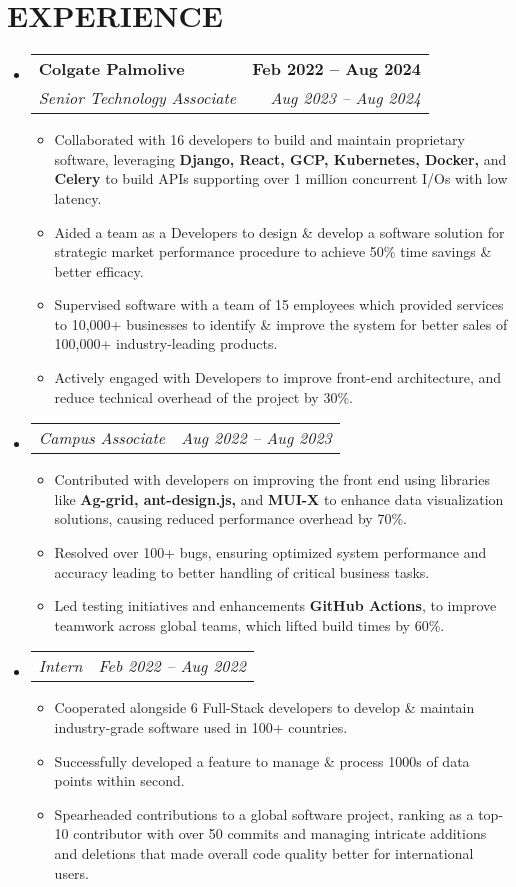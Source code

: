 \documentclass[letterpaper,10pt]{article}
\makeatletter
\newcommand{\resumeItem}[1]{
  \item\small{
    {#1 \vspace{-2pt}}
  }
}
\newcommand{\resumeSubheading}[4]{
  \vspace{2pt}\item
    \begin{tabular*}{1.0\textwidth}[t]{l@{\extracolsep{\fill}}r}
      \textbf{\large#1} & \textbf{\normalsize #2} \\
      \textit{\large#3} & \textit{\small #4} \\
    \end{tabular*}\vspace{-7pt}
}
\newcommand{\resumeSubSubheading}[2]{
  \vspace{-6pt}\item
    \begin{tabular*}{1.0\textwidth}[t]{l@{\extracolsep{\fill}}r}
      \textit{\large#1} & \textit{\small #2} \\
    \end{tabular*}\vspace{-7pt}
}
\newcommand{\resumeSubHeadingListStart}{\begin{itemize}[leftmargin=0.0in, label={}]}
\newcommand{\resumeSubHeadingListEnd}{\end{itemize}}
\newcommand{\resumeItemListStart}{\begin{itemize}}
\newcommand{\resumeItemListEnd}{\end{itemize}\vspace{-5pt}}
\makeatother
\begin{document}
\section{EXPERIENCE}
\resumeSubHeadingListStart
    \resumeSubheading{Colgate Palmolive 
    \href{https://drive.google.com/file/d/1Bn6h0GvFtkDxE25o8SCpva6-QOglHDiO/view?usp=drive_link}{\raisebox{-0.1\height}\faExternalLink }
    }{Feb 2022 -- Aug 2024}
    {Senior Technology Associate}{Aug 2023 -- Aug 2024}
    \resumeItemListStart
        \resumeItem{\normalsize{Collaborated with 16 developers to build and maintain proprietary software, leveraging \textbf{Django, React, GCP, Kubernetes, Docker,} and \textbf{Celery} to build APIs supporting over 1 million concurrent I/Os with low latency.}}
        \resumeItem{\normalsize{Aided a team as a Developers to design \& develop a software solution for strategic market performance procedure to achieve 50\% time savings \& better efficacy.}}
        \resumeItem{\normalsize{Supervised software with a team of 15 employees which provided services to 10,000+ businesses to identify \& improve the system for better sales of 100,000+ industry-leading products.}}
        \resumeItem{\normalsize{Actively engaged with Developers to improve front-end architecture, and reduce technical overhead of the project by 30\%.}}
    \resumeItemListEnd
    \vspace{-8pt}
    \resumeSubSubheading{Campus Associate}{Aug 2022 -- Aug 2023}
    \resumeItemListStart
        \resumeItem{\normalsize{Contributed with developers on improving the front end using libraries like \textbf{Ag-grid, ant-design.js,} and \textbf{MUI-X} to enhance data visualization solutions, causing reduced performance overhead by 70\%.}}
        \resumeItem{\normalsize{Resolved over 100+ bugs, ensuring optimized system performance and accuracy leading to better handling of critical business tasks.}}
        \resumeItem{\normalsize{Led testing initiatives and enhancements \textbf{GitHub Actions}, to improve teamwork across global teams, which lifted build times by 60\%.}}
    \resumeItemListEnd
    \resumeSubSubheading{Intern}{Feb 2022 -- Aug 2022}
    \resumeItemListStart
        \resumeItem{\normalsize{Cooperated alongside 6 Full-Stack developers to develop \& maintain industry-grade software used in 100+ countries.}}
        \resumeItem{\normalsize{Successfully developed a feature to manage \& process 1000s of data points within second.}}
        \resumeItem{\normalsize{Spearheaded contributions to a global software project, ranking as a top-10 contributor with over 50 commits and managing intricate additions and deletions that made overall code quality better for international users.}}
    \resumeItemListEnd
\resumeSubHeadingListEnd
\vspace{-12pt}
\end{document}
